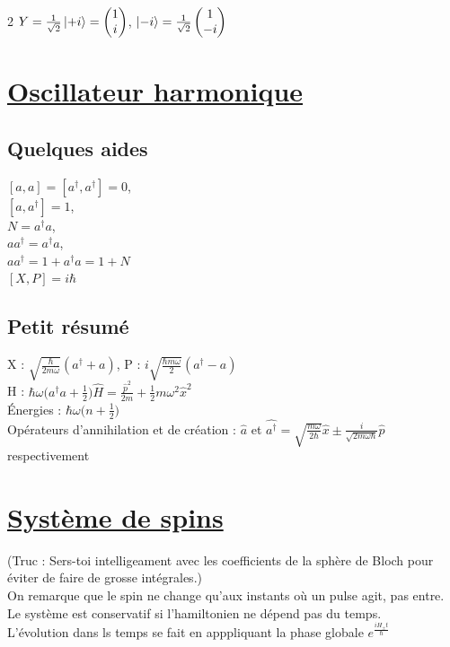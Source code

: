 \documentclass[11pt]{article}
\begin{document}
\begin{multicols}{2}
  $Y=\frac{1}{\sqrt{2}}\ket{+i}=\begin{pmatrix}
    1\\
    i\\
  \end{pmatrix}$, $\ket{-i}=\frac{1}{\sqrt{2}}\begin{pmatrix}
    1\\
    -i\\
  \end{pmatrix}$\\

  \section{\underline{Oscillateur harmonique}}
  \subsection{Quelques aides}
  $[a,a]=[a^\dagger,a^\dagger]=0$,\\
  $[a,a^\dagger] = 1$,\\
  $N=a^{\dagger}a$,\\
  $aa^\dagger = a^{\dagger}a$,\\ 
  $aa^\dagger = 1+a^{\dagger}a = 1 + N$\\
  $[X,P]=i\hbar$
  \subsection{Petit résumé}
  X : $\sqrt{\frac{\hbar}{2m\omega}}(a^\dagger +a)$, P : $i\sqrt{\frac{\hbar m\omega}{2}}(a^\dagger -a)$\\
  H : $\hbar\omega\bigg(a^\dagger a+\frac{1}{2}\bigg)\hat{H}=\frac{{\hat{p}^2}}{2m}+\frac{1}{2}m\omega^2\hat{x}^2$\\
  Énergies : $\hbar\omega\bigg(n + \frac{1}{2}\bigg)$\\
  Opérateurs d'annihilation et de création : $\hat{a}$ et $\hat{a^\dagger}=\sqrt{\frac{m\omega}{2\hbar}}\hat{x}\pm\frac{i}{\sqrt{2m\omega\hbar}}\hat{p}$ respectivement\\

  \section{\underline{Système de spins}}
  (Truc : Sers-toi intelligeament avec les coefficients de la sphère de Bloch pour éviter de faire de grosse intégrales.)\\
  On remarque que le spin ne change qu'aux instants où un pulse agit, pas entre.\\
  Le système est conservatif si l'hamiltonien ne dépend pas du temps.\\
  L'évolution dans ls temps se fait en apppliquant la phase globale $e^{\frac{iH_\pm t}{\hbar}}$

\end{multicols}
\end{document}
